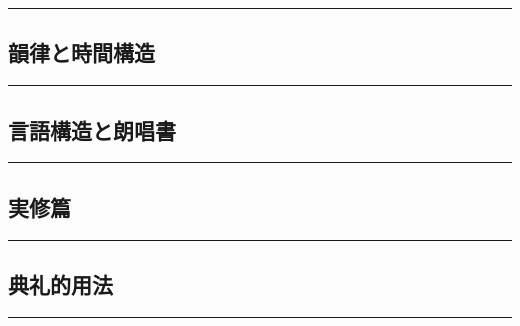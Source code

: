 \documentclass[
  japanese,
]{article}
\begin{document}
\begin{center}\rule{0.5\linewidth}{0.5pt}\end{center}

\subsection{韻律と時間構造}\label{chapter6}

\begin{center}\rule{0.5\linewidth}{0.5pt}\end{center}

\subsection{言語構造と朗唱書}\label{chapter7}

\begin{center}\rule{0.5\linewidth}{0.5pt}\end{center}

\subsection{実修篇}\label{chapter8}

\begin{center}\rule{0.5\linewidth}{0.5pt}\end{center}

\subsection{典礼的用法}\label{chapter9}

\begin{center}\rule{0.5\linewidth}{0.5pt}\end{center}
\end{document}
